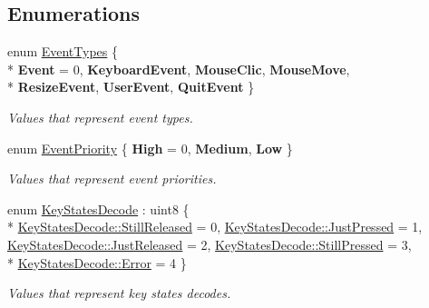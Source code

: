 \subsection*{Enumerations}
\begin{DoxyCompactItemize}
\item 
enum \hyperlink{namespaceae_core_a7d223e7c71884d3c16af38872bc2366f}{Event\+Types} \{ \\*
{\bfseries Event} = 0, 
{\bfseries Keyboard\+Event}, 
{\bfseries Mouse\+Clic}, 
{\bfseries Mouse\+Move}, 
\\*
{\bfseries Resize\+Event}, 
{\bfseries User\+Event}, 
{\bfseries Quit\+Event}
 \}\hypertarget{namespaceae_core_a7d223e7c71884d3c16af38872bc2366f}{}\label{namespaceae_core_a7d223e7c71884d3c16af38872bc2366f}
\begin{DoxyCompactList}\small\item\em Values that represent event types. \end{DoxyCompactList}
\item 
enum \hyperlink{namespaceae_core_ad6208eae33dbc16df31016e295de220a}{Event\+Priority} \{ {\bfseries High} = 0, 
{\bfseries Medium}, 
{\bfseries Low}
 \}\hypertarget{namespaceae_core_ad6208eae33dbc16df31016e295de220a}{}\label{namespaceae_core_ad6208eae33dbc16df31016e295de220a}
\begin{DoxyCompactList}\small\item\em Values that represent event priorities. \end{DoxyCompactList}
\item 
enum \hyperlink{namespaceae_core_aa7afae6827a908a9adc5250cf17d52cb}{Key\+States\+Decode} \+: uint8 \{ \\*
\hyperlink{namespaceae_core_aa7afae6827a908a9adc5250cf17d52cba79b3e6a6685449bd8e622dd6acd2149a}{Key\+States\+Decode\+::\+Still\+Released} = 0, 
\hyperlink{namespaceae_core_aa7afae6827a908a9adc5250cf17d52cbac2e67bf45734245fb60def6a8059c06c}{Key\+States\+Decode\+::\+Just\+Pressed} = 1, 
\hyperlink{namespaceae_core_aa7afae6827a908a9adc5250cf17d52cba3621e68a905d433b120899458aeda38d}{Key\+States\+Decode\+::\+Just\+Released} = 2, 
\hyperlink{namespaceae_core_aa7afae6827a908a9adc5250cf17d52cba02808ac0476f904e4b1cd4da5fa896cc}{Key\+States\+Decode\+::\+Still\+Pressed} = 3, 
\\*
\hyperlink{namespaceae_core_aa7afae6827a908a9adc5250cf17d52cba902b0d55fddef6f8d651fe1035b7d4bd}{Key\+States\+Decode\+::\+Error} = 4
 \}\begin{DoxyCompactList}\small\item\em Values that represent key states decodes. \end{DoxyCompactList}

\end{DoxyCompactItemize}
